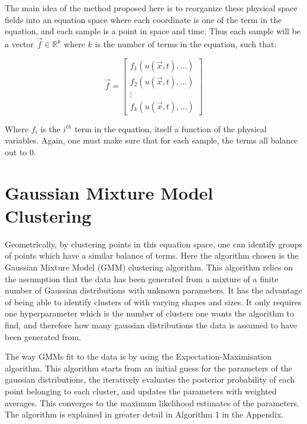 \documentclass[12pt]{report} %
\begin{document}

The main idea of the method proposed here is to reorganize these physical space fields into an equation space where each coordinate is one of the term in the equation, and each sample is a point in space and time. Thus each sample will be a vector $\vec{f} \in \mathbb{R}^k$ where $k$ is the number of terms in the equation, such that:

\begin{equation}
    \vec{f} = \begin{bmatrix} f_1(u(\vec{x}, t), \hdots) \\ f_2(u(\vec{x}, t), \hdots) \\ \vdots \\ f_k(u(\vec{x}, t), \hdots) \end{bmatrix}
\end{equation}

Where $f_i$ is the $i^{th}$ term in the equation, itself a function of the physical variables. Again, one must make sure that for each sample, the terms all balance out to 0.


\section{Gaussian Mixture Model Clustering}

Geometrically, by clustering points in this equation space, one can identify groups of points which have a similar balance of terms. Here the algorithm chosen is the Gaussian Mixture Model (GMM) clustering algorithm. This algorithm relies on the assumption that the data has been generated from a mixture of a finite number of Gaussian distributions with unknown parameters\cite{mit2015algorithmic}. It has the advantage of being able to identify clusters of with varying shapes and sizes. It only requires one hyperparameter which is the number of clusters one wants the algorithm to find, and therefore how many gaussian distributions the data is assumed to have been generated from\cite{sklearnGMM}.

The way GMMs fit to the data is by using the Expectation-Maximisation algorithm. This algorithm starts from an initial guess for the parameters of the gaussian distributions, the iteratively evaluates the posterior probability of each point belonging to each cluster, and updates the parameters with weighted averages\cite{dempster1977maximum}. This converges to the maximum likelihood estimates of the parameters. The algorithm is explained in greater detail in Algorithm 1 in the Appendix.
\end{document}

